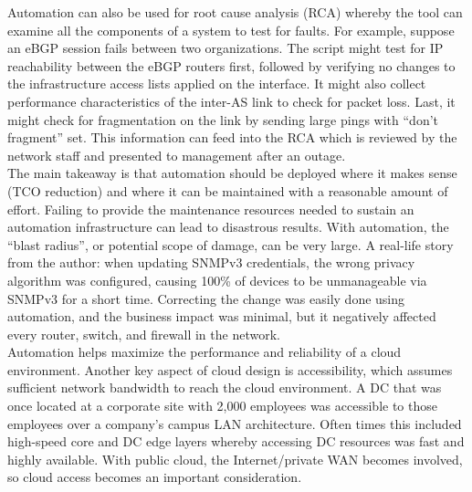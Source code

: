 Automation can also be used for root cause analysis (RCA) whereby the tool can
examine all the components of a system to test for faults. For example,
suppose an eBGP session fails between two organizations. The script might test
for IP reachability between the eBGP routers first, followed by verifying no
changes to the infrastructure access lists applied on the interface. It might
also collect performance characteristics of the inter-AS link to check for
packet loss. Last, it might check for fragmentation on the link by sending
large pings with ``don’t fragment'' set. This information can feed into the RCA
which is reviewed by the network staff and presented to management after an
outage. \\

The main takeaway is that automation should be deployed where it makes sense
(TCO reduction) and where it can be maintained with a reasonable amount of
effort. Failing to provide the maintenance resources needed to sustain an
automation infrastructure can lead to disastrous results. With automation, the
``blast radius'', or potential scope of damage, can be very large. A real-life
story from the author: when updating SNMPv3 credentials, the wrong privacy
algorithm was configured, causing 100\% of devices to be unmanageable via
SNMPv3 for a short time. Correcting the change was easily done using
automation, and the business impact was minimal, but it negatively affected
every router, switch, and firewall in the network. \\

Automation helps maximize the performance and reliability of a cloud
environment. Another key aspect of cloud design is accessibility, which
assumes sufficient network bandwidth to reach the cloud environment. A DC that
was once located at a corporate site with 2,000 employees was accessible to
those employees over a company’s campus LAN architecture. Often times this
included high-speed core and DC edge layers whereby accessing DC resources was
fast and highly available. With public cloud, the Internet/private WAN becomes
involved, so cloud access becomes an important consideration. \\

